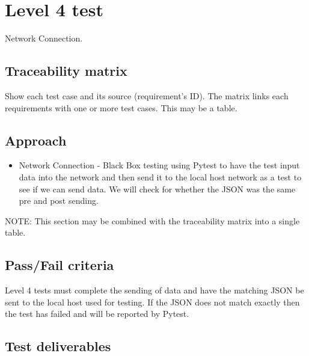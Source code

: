 \documentclass[letterpaper,12pt,oneside,listof=totoc]{scrreprt}
\begin{document}
\section{Level 4 test }
Network Connection.

\subsection{Traceability matrix}

Show each test case and its source (requirement's ID). The matrix links each requirements with one or more test cases. This may be a table.

\subsection{Approach}
\begin{itemize}
    \item Network Connection - Black Box testing using Pytest to have the test input data into the network and then send it to the local host network as a test to see if we can send data. We will check for whether the JSON was the same pre and post sending.
\end{itemize}
\endlist

NOTE: This section may be combined with the traceability matrix into a single table.

\subsection{Pass/Fail criteria}

Level 4 tests must complete the sending of data and have the matching JSON be sent to the local host used for testing. If the JSON does not match exactly then the test has failed and will be reported by Pytest.


\subsection{Test deliverables}
\end{document}
